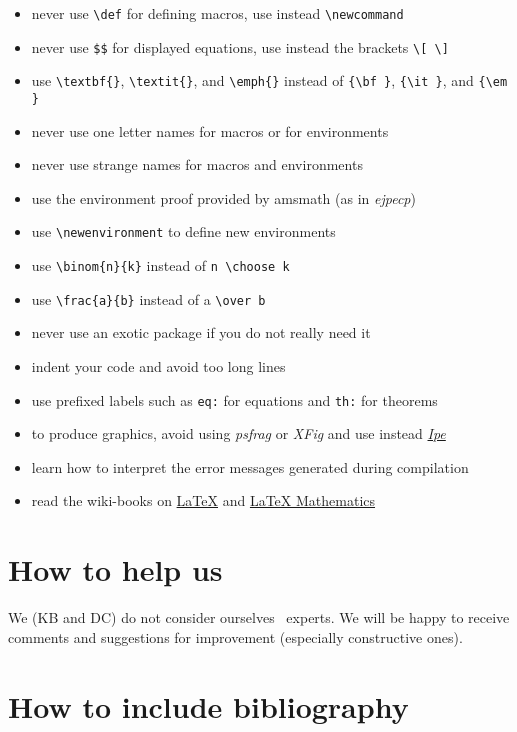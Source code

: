 \documentclass[ECP]{ejpecp} %
\begin{document}
\begin{itemize}
\item never use \verb+\def+ for defining macros, use instead
  \verb+\newcommand+
\item never use \verb+$$+ for displayed equations, use instead the brackets
  \verb+\[ \]+
\item use \verb+\textbf{}+, \verb+\textit{}+, and \verb+\emph{}+ instead of
  \verb+{\bf }+, \verb+{\it }+, and \verb+{\em }+
\item never use one letter names for macros or for environments
\item never use strange names for macros and environments
\item use the environment proof provided by amsmath (as in \emph{ejpecp})
\item use \verb+\newenvironment+ to define new environments
\item use \verb+\binom{n}{k}+ instead of \verb+n \choose k+
\item use \verb+\frac{a}{b}+ instead of a \verb+\over b+
\item never use an exotic package if you do not really need it
\item indent your code and avoid too long lines
\item use prefixed labels such as \verb+eq:+ for equations and \verb+th:+ for
  theorems
\item to produce graphics, avoid using \emph{psfrag} or \emph{XFig} and use
  instead \emph{\href{http://en.wikipedia.org/wiki/Ipe_(program)}{Ipe}}
\item learn how to interpret the error messages generated during compilation
\item read the wiki-books on \href{http://en.wikibooks.org/wiki/LaTeX}{LaTeX}
  and \href{http://en.wikibooks.org/wiki/LaTeX/Mathematics}{LaTeX Mathematics}
\end{itemize}

\section{How to help us}

We (KB and DC) do not consider ourselves \LaTeXe\ experts.
We will be happy to receive comments and suggestions for improvement
(especially constructive ones).

\section{How to include bibliography}
\end{document}
